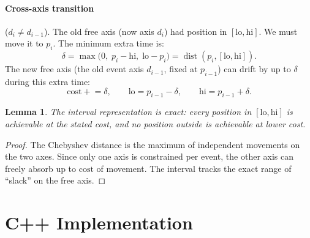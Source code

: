 \documentclass[11pt,a4paper]{article}
\newtheorem{lemma}[theorem]{Lemma}
\begin{document}
\paragraph{Cross-axis transition} ($d_i \ne d_{i-1}$).
The old free axis (now axis $d_i$) had position in $[\mathrm{lo}, \mathrm{hi}]$.
We must move it to $p_i$. The minimum extra time is:
\[
  \delta = \max\bigl(0,\; p_i - \mathrm{hi},\; \mathrm{lo} - p_i\bigr)
  = \operatorname{dist}(p_i, [\mathrm{lo}, \mathrm{hi}]).
\]
The new free axis (the old event axis $d_{i-1}$, fixed at $p_{i-1}$)
can drift by up to $\delta$ during this extra time:
\[
  \mathrm{cost} \mathrel{+}= \delta, \qquad
  \mathrm{lo} = p_{i-1} - \delta, \qquad
  \mathrm{hi} = p_{i-1} + \delta.
\]

\begin{lemma}
The interval representation is exact: every position in
$[\mathrm{lo}, \mathrm{hi}]$ is achievable at the stated cost, and no
position outside is achievable at lower cost.
\end{lemma}
\begin{proof}
The Chebyshev distance is the maximum of independent movements on the
two axes. Since only one axis is constrained per event, the other axis
can freely absorb up to $\mathrm{cost}$ of movement. The interval
tracks the exact range of ``slack'' on the free axis.
\end{proof}

\section{C++ Implementation}
\end{document}
